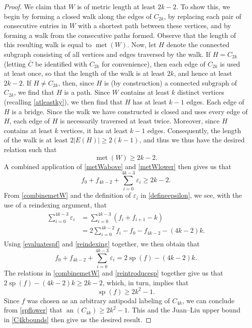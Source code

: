 \documentclass[10pt,a4paper]{amsart}
\begin{document}
\begin{proof}
 We claim that $W$ is of metric length at least $2k-2$. To show this, we begin by forming a closed walk along the edges of $C_{2k}$, by 
 replacing each pair of consecutive entries in $W$ with a shortest path between these vertices, and by forming a walk from the 
 consecutive paths formed. Observe that the length of this resulting walk is equal to $\operatorname{met}(W)$. Now, let $H$ denote 
 the connected subgraph consisting of all vertices and edges traversed by the walk. If $H = C_{2k}$ (letting $\overline{C}$ be identified 
 with $C_{2k}$ for convenience), then each edge of $C_{2k}$ is used at least once, so that the length of the walk is at least $2k$, and 
 hence at least $2k-2$. If $H \neq C_{2k}$, then, since $H$ is (by construction) a connected subgraph of $C_{2k}$, we find that $H$ is a 
 path. Since $W$ contains at least $k$ distinct vertices (recalling \eqref{atleastky}), we then find that $H$ has at least $k - 1$ edges. 
 Each edge of $H$ is a bridge. Since the walk we have constructed is closed and uses every edge of $H$, each edge of $H$ is necessarily
 traversed at least twice. Moreover, since $H$ contains at least $k$ vertices, it has at least $k-1$ edges. Consequently, the length of the 
 walk is at least $2 | E(H) | \geq 2(k-1)$, and thus we thus have the desired relation such that
\begin{equation}\label{metWlower}
 \operatorname{met}(W) \geq 2 k - 2. 
\end{equation} 
 A combined application of \eqref{metWabove} and \eqref{metWlower} then gives us that 
\begin{equation}\label{combinemetW} 
 f_{0} + f_{4k-2} + \sum_{i=0}^{4k-3} \varepsilon_{i} \geq 2 k - 2. 
\end{equation}
 From \eqref{combinemetW} and the definition of $\varepsilon_{i}$ in \eqref{defineepsilon}, we see, 
 with the use of a reindexing argument, that 
\begin{align}
\begin{split}
 \sum_{i=0}^{4k-3} \varepsilon_{i} 
 & = \sum_{i=0}^{4k-3} (f_{i} + f_{i+1} - k) \\ 
 & = 2 \sum_{i=0}^{4k-2} f_{i} - f_{0} - f_{4k-2} - (4k-2) k.
\end{split}\label{reindexing}
\end{align}
 Using \eqref{evaluatespf} and \eqref{reindexing} together, we then obtain that 
\begin{equation}\label{reintroducesp} 
 f_{0} + f_{4k-2} + \sum_{i=0}^{4k-3} \varepsilon_{i} = 2 \operatorname{sp}(f) - (4k-2) k. 
\end{equation}
 The relations in \eqref{combinemetW} and \eqref{reintroducesp} together give us that $ 2 \operatorname{sp}(f) - (4 k - 2) k \geq 2 k - 
 2$, which, in turn, implies that 
\begin{equation}\label{spflower} 
 \operatorname{sp}(f) \geq 2 k^2 - 1. 
\end{equation}
 Since $f$ was chosen as an arbitrary antipodal labeling of $C_{4k}$, we can conclude from \eqref{spflower} that 
 $\operatorname{an}(C_{4k}) \geq 2k^2 - 1$. This and the Juan--Liu upper bound in \eqref{C4kbounds} 
 \cite[Theorem 9]{JuanLiu2012}
 then give us the desired result. 
\end{proof}
\end{document}
